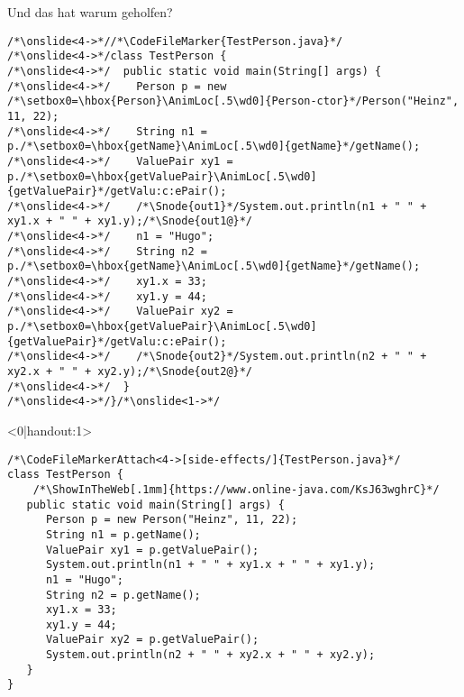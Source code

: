 {\begin{frame}[fragile,t]{Und das hat warum geholfen?}
\begin{onlyenv}
\begin{verbatim}
/*\onslide<4->*//*\CodeFileMarker{TestPerson.java}*/
/*\onslide<4->*/class TestPerson {
/*\onslide<4->*/  public static void main(String[] args) {
/*\onslide<4->*/    Person p = new /*\setbox0=\hbox{Person}\AnimLoc[.5\wd0]{Person-ctor}*/Person("Heinz", 11, 22);
/*\onslide<4->*/    String n1 = p./*\setbox0=\hbox{getName}\AnimLoc[.5\wd0]{getName}*/getName();
/*\onslide<4->*/    ValuePair xy1 = p./*\setbox0=\hbox{getValuePair}\AnimLoc[.5\wd0]{getValuePair}*/getValu:c:ePair();
/*\onslide<4->*/    /*\Snode{out1}*/System.out.println(n1 + " " + xy1.x + " " + xy1.y);/*\Snode{out1@}*/
/*\onslide<4->*/    n1 = "Hugo";
/*\onslide<4->*/    String n2 = p./*\setbox0=\hbox{getName}\AnimLoc[.5\wd0]{getName}*/getName();
/*\onslide<4->*/    xy1.x = 33;
/*\onslide<4->*/    xy1.y = 44;
/*\onslide<4->*/    ValuePair xy2 = p./*\setbox0=\hbox{getValuePair}\AnimLoc[.5\wd0]{getValuePair}*/getValu:c:ePair();
/*\onslide<4->*/    /*\Snode{out2}*/System.out.println(n2 + " " + xy2.x + " " + xy2.y);/*\Snode{out2@}*/
/*\onslide<4->*/  }
/*\onslide<4->*/}/*\onslide<1->*/
\end{verbatim}
\endAnimateCode{}
\end{onlyenv}
\begin{onlyenv}<0|handout:1>
\begin{verbatim}
/*\CodeFileMarkerAttach<4->[side-effects/]{TestPerson.java}*/
class TestPerson {
    /*\ShowInTheWeb[.1mm]{https://www.online-java.com/KsJ63wghrC}*/
   public static void main(String[] args) {
      Person p = new Person("Heinz", 11, 22);
      String n1 = p.getName();
      ValuePair xy1 = p.getValuePair();
      System.out.println(n1 + " " + xy1.x + " " + xy1.y);
      n1 = "Hugo";
      String n2 = p.getName();
      xy1.x = 33;
      xy1.y = 44;
      ValuePair xy2 = p.getValuePair();
      System.out.println(n2 + " " + xy2.x + " " + xy2.y);
   }
}
\end{verbatim}
\end{onlyenv}
\endcolumns%
\end{frame}}
